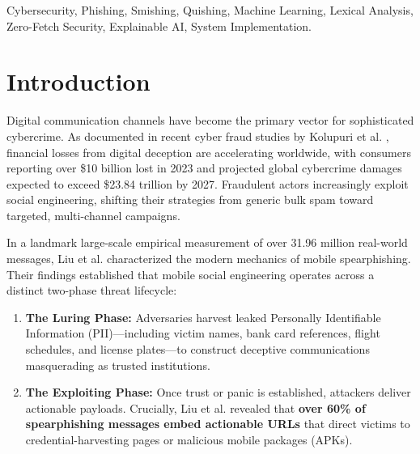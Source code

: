 \documentclass[conference]{IEEEtran}
\begin{document}
\begin{IEEEkeywords}
Cybersecurity, Phishing, Smishing, Quishing, Machine Learning, Lexical Analysis, Zero-Fetch Security, Explainable AI, System Implementation.
\end{IEEEkeywords}

\section{Introduction}
Digital communication channels have become the primary vector for sophisticated cybercrime. As documented in recent cyber fraud studies by Kolupuri et al. \cite{kolupuri2025scams}, financial losses from digital deception are accelerating worldwide, with consumers reporting over \$10 billion lost in 2023 and projected global cybercrime damages expected to exceed \$23.84 trillion by 2027. Fraudulent actors increasingly exploit social engineering, shifting their strategies from generic bulk spam toward targeted, multi-channel campaigns.

In a landmark large-scale empirical measurement of over 31.96 million real-world messages, Liu et al. \cite{liu2021detecting} characterized the modern mechanics of mobile spearphishing. Their findings established that mobile social engineering operates across a distinct two-phase threat lifecycle:
\begin{enumerate}
    \item \textbf{The Luring Phase:} Adversaries harvest leaked Personally Identifiable Information (PII)---including victim names, bank card references, flight schedules, and license plates---to construct deceptive communications masquerading as trusted institutions.
    \item \textbf{The Exploiting Phase:} Once trust or panic is established, attackers deliver actionable payloads. Crucially, Liu et al. revealed that \textbf{over 60\% of spearphishing messages embed actionable URLs} that direct victims to credential-harvesting pages or malicious mobile packages (APKs).
\end{enumerate}
\end{document}
